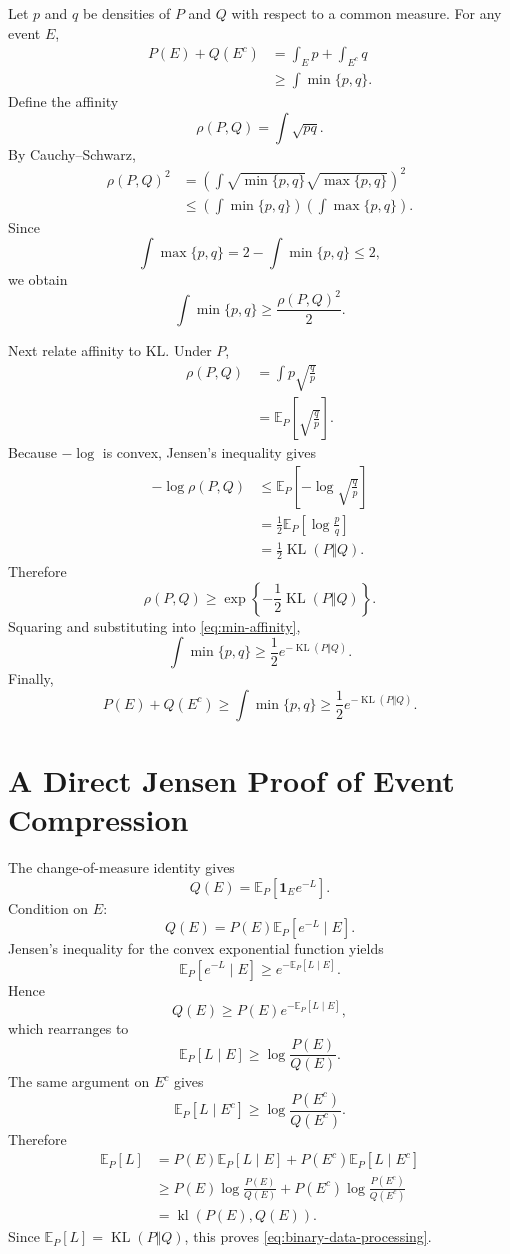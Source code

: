 \documentclass[en,nofont,11pt]{elegantbook}
\newcommand{\E}{\mathbb{E}}
\newcommand{\one}{\mathbf{1}}
\newcommand{\KL}{\operatorname{KL}}
\newcommand{\kl}{\operatorname{kl}}
\begin{document}
Let $p$ and $q$ be densities of $P$ and $Q$ with respect to a common measure. For any event $E$,
\begin{align*}
P(E)+Q(E^c)
&=
\int_E p+\int_{E^c}q\\
&\geq
\int \min\{p,q\}.
\end{align*}
Define the affinity
\[
\rho(P,Q)=\int\sqrt{pq}.
\]
By Cauchy--Schwarz,
\begin{align*}
\rho(P,Q)^2
&=
\left(
\int
\sqrt{\min\{p,q\}}
\sqrt{\max\{p,q\}}
\right)^2\\
&\leq
\left(\int\min\{p,q\}\right)
\left(\int\max\{p,q\}\right).
\end{align*}
Since
\[
\int\max\{p,q\}
=2-\int\min\{p,q\}
\leq2,
\]
we obtain
\begin{equation}
\int\min\{p,q\}
\geq
\frac{\rho(P,Q)^2}{2}.
\label{eq:min-affinity}
\end{equation}

Next relate affinity to KL. Under $P$,
\begin{align*}
\rho(P,Q)
&=
\int p\sqrt{\frac{q}{p}}\\
&=
\E_P\left[\sqrt{\frac{q}{p}}\right].
\end{align*}
Because $-\log$ is convex, Jensen's inequality gives
\begin{align*}
-\log\rho(P,Q)
&\leq
\E_P\left[
-\log\sqrt{\frac{q}{p}}
\right]\\
&=
\frac12\E_P\left[\log\frac{p}{q}\right]\\
&=
\frac12\KL(P\Vert Q).
\end{align*}
Therefore
\[
\rho(P,Q)
\geq
\exp\left\{-\frac12\KL(P\Vert Q)\right\}.
\]
Squaring and substituting into \eqref{eq:min-affinity},
\[
\int\min\{p,q\}
\geq
\frac12e^{-\KL(P\Vert Q)}.
\]
Finally,
\[
P(E)+Q(E^c)
\geq
\int\min\{p,q\}
\geq
\frac12e^{-\KL(P\Vert Q)}.
\]

\chapter*{A Direct Jensen Proof of Event Compression}

The change-of-measure identity gives
\[
Q(E)=\E_P[\one_Ee^{-L}].
\]
Condition on $E$:
\[
Q(E)
=P(E)\E_P[e^{-L}\mid E].
\]
Jensen's inequality for the convex exponential function yields
\[
\E_P[e^{-L}\mid E]
\geq
e^{-\E_P[L\mid E]}.
\]
Hence
\[
Q(E)
\geq
P(E)e^{-\E_P[L\mid E]},
\]
which rearranges to
\[
\E_P[L\mid E]
\geq
\log\frac{P(E)}{Q(E)}.
\]
The same argument on $E^c$ gives
\[
\E_P[L\mid E^c]
\geq
\log\frac{P(E^c)}{Q(E^c)}.
\]
Therefore
\begin{align*}
\E_P[L]
&=
P(E)\E_P[L\mid E]
+P(E^c)\E_P[L\mid E^c]\\
&\geq
P(E)\log\frac{P(E)}{Q(E)}
+P(E^c)\log\frac{P(E^c)}{Q(E^c)}\\
&=
\kl(P(E),Q(E)).
\end{align*}
Since $\E_P[L]=\KL(P\Vert Q)$, this proves \eqref{eq:binary-data-processing}.
\end{document}
